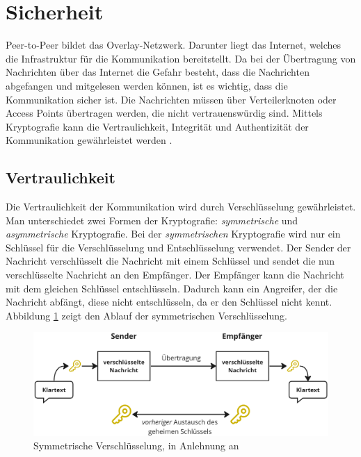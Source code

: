 \section{Sicherheit}
\label{sec:sicherheit_basics}


Peer-to-Peer bildet das Overlay-Netzwerk. Darunter liegt das Internet, welches die Infrastruktur für die Kommunikation bereitstellt. Da bei der Übertragung von Nachrichten über das Internet die Gefahr besteht, dass die Nachrichten abgefangen und mitgelesen werden können, ist es wichtig, dass die Kommunikation sicher ist. Die Nachrichten müssen über Verteilerknoten oder Access Points übertragen werden, die nicht vertrauenswürdig sind. Mittels Kryptografie kann die Vertraulichkeit, Integrität und Authentizität der Kommunikation gewährleistet werden \Parencite[S. 7]{Hellmann_IT-Sicherheit}.

\subsection{Vertraulichkeit}

Die Vertraulichkeit der Kommunikation wird durch Verschlüsselung gewährleistet. Man unterschiedet zwei Formen der Kryptografie: \textit{symmetrische} und \textit{asymmetrische} Kryptografie. Bei der \textit{symmetrischen} Kryptografie wird nur ein Schlüssel für die Verschlüsselung und Entschlüsselung verwendet. Der Sender der Nachricht verschlüsselt die Nachricht mit einem Schlüssel und sendet die nun verschlüsselte Nachricht an den Empfänger. Der Empfänger kann die Nachricht mit dem gleichen Schlüssel entschlüsseln. Dadurch kann ein Angreifer, der die Nachricht abfängt, diese nicht entschlüsseln, da er den Schlüssel nicht kennt. Abbildung \ref{fig:symmetrische_verschluesselung} zeigt den Ablauf der symmetrischen Verschlüsselung.

\begin{center}
    \begin{figure}[H]
        \centering
        \includegraphics[width=1\linewidth]{images/symmetric_encryption.png}
        \caption{Symmetrische Verschlüsselung, in Anlehnung an \cite{ElektronikKompendium_symmetrischeVerschluesselung}}
        \label{fig:symmetrische_verschluesselung}
    \end{figure}
\end{center}

